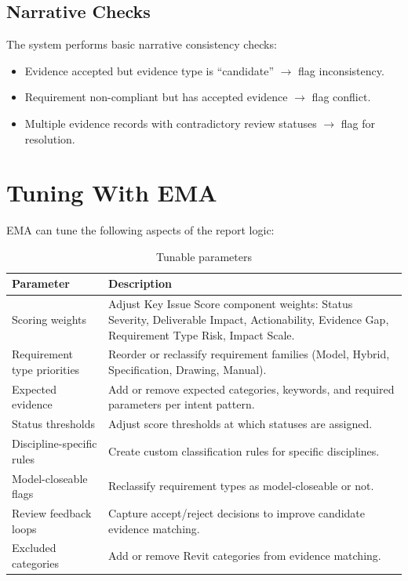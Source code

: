 \documentclass[10pt,letterpaper]{article}
\begin{document}
\subsection{Narrative Checks}

The system performs basic narrative consistency checks:
\begin{itemize}
  \item Evidence accepted but evidence type is ``candidate'' $\rightarrow$ flag inconsistency.
  \item Requirement non-compliant but has accepted evidence $\rightarrow$ flag conflict.
  \item Multiple evidence records with contradictory review statuses $\rightarrow$ flag for
        resolution.
\end{itemize}

\section{Tuning With EMA}
\label{sec:tuning}

EMA can tune the following aspects of the report logic:

\begin{longtable}{p{1.8in}p{4.5in}}
\caption{Tunable parameters}
\label{tab:tunable}\\
\toprule
\textbf{Parameter} & \textbf{Description} \\
\midrule
\endhead
Scoring weights & Adjust Key Issue Score component weights: Status Severity, Deliverable Impact,
  Actionability, Evidence Gap, Requirement Type Risk, Impact Scale. \\
Requirement type priorities & Reorder or reclassify requirement families (Model, Hybrid,
  Specification, Drawing, Manual). \\
Expected evidence & Add or remove expected categories, keywords, and required parameters per
  intent pattern. \\
Status thresholds & Adjust score thresholds at which statuses are assigned. \\
Discipline-specific rules & Create custom classification rules for specific disciplines. \\
Model-closeable flags & Reclassify requirement types as model-closeable or not. \\
Review feedback loops & Capture accept/reject decisions to improve candidate evidence matching. \\
Excluded categories & Add or remove Revit categories from evidence matching. \\
\bottomrule
\end{longtable}
\end{document}
